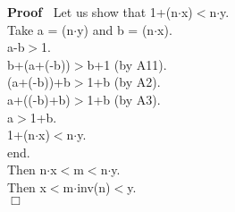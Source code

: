\documentclass{article}
\newenvironment{forthel}{\begin{leftbar}}{\end{leftbar}}
\newenvironment{proof}{\noindent\textbf{Proof\ }}{\hspace*{\fill}$\Box$\medskip}
\begin{document}
\begin{forthel}
\begin{proof}
Let us show that 1+(n$\cdot$x)$<$n$\cdot$y.\\
Take a = (n$\cdot$y) and b = (n$\cdot$x).\\
a-b$>$1.\\
b+(a+(-b))$>$b+1 (by A11).\\
(a+(-b))+b$>$1+b (by A2).\\
a+((-b)+b)$>$1+b (by A3).\\
a$>$1+b.\\
1+(n$\cdot$x)$<$n$\cdot$y.\\
end.\\

Then n$\cdot$x$<$m$<$n$\cdot$y.\\
Then x$<$m$\cdot$inv(n)$<$y.\\

\end{proof}












\end{forthel}
\end{document}
